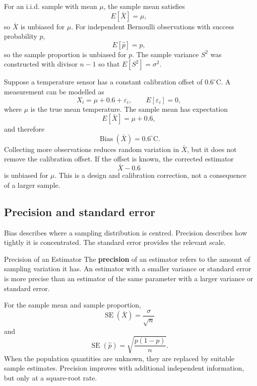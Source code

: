 For an i.i.d. sample with mean $\mu$, the sample mean satisfies
\[
    E[\bar X]=\mu,
\]
so $\bar X$ is unbiased for $\mu$. For independent Bernoulli observations with success probability $p$,
\[
    E[\widehat p]=p,
\]
so the sample proportion is unbiased for $p$. The sample variance $S^2$ was constructed with divisor $n-1$ so that $E[S^2]=\sigma^2$.

\begin{example}\par
Suppose a temperature sensor has a constant calibration offset of $0.6^\circ\mathrm{C}$. A measurement can be modelled as
\[
    X_i=\mu+0.6+\varepsilon_i,
    \qquad E[\varepsilon_i]=0,
\]
where $\mu$ is the true mean temperature. The sample mean has expectation
\[
    E[\bar X]=\mu+0.6,
\]
and therefore
\[
    \operatorname{Bias}(\bar X)=0.6^\circ\mathrm{C}.
\]
Collecting more observations reduces random variation in $\bar X$, but it does not remove the calibration offset. If the offset is known, the corrected estimator
\[
    \bar X-0.6
\]
is unbiased for $\mu$. This is a design and calibration correction, not a consequence of a larger sample.
\end{example}

\subsection{Precision and standard error}

Bias describes where a sampling distribution is centred. Precision describes how tightly it is concentrated. The standard error provides the relevant scale.

\begin{definition}{Precision of an Estimator}
The \textbf{precision} of an estimator refers to the amount of sampling variation it has. An estimator with a smaller variance or standard error is more precise than an estimator of the same parameter with a larger variance or standard error.
\end{definition}

For the sample mean and sample proportion,
\[
    \operatorname{SE}(\bar X)=\frac{\sigma}{\sqrt n}
\]
and
\[
    \operatorname{SE}(\widehat p)
      =\sqrt{\frac{p(1-p)}{n}}.
\]
When the population quantities are unknown, they are replaced by suitable sample estimates. Precision improves with additional independent information, but only at a square-root rate.

